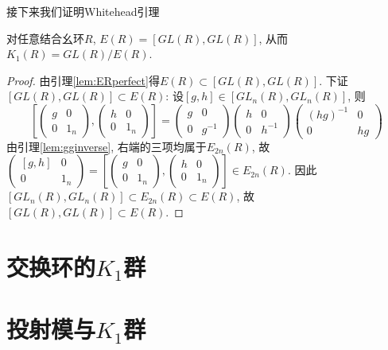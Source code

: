 接下来我们证明Whitehead引理
\begin{lemma}
	对任意结合幺环$R$, $E(R)=[GL(R),GL(R)]$, 从而$K_1(R)=GL(R)/E(R)$.
\end{lemma}
\begin{proof}
	由引理\ref{lem:ERperfect}得$E(R)\subset [GL(R),GL(R)]$. 下证$[GL(R),GL(R)]\subset E(R)$:
	设$[g,h]\in [GL_n(R),GL_n(R)]$, 则
	\[\left[\begin{pmatrix}
	g & 0\\ 0 & 1_n
\end{pmatrix},\begin{pmatrix}
	h & 0\\ 0 & 1_n
\end{pmatrix}\right]=\begin{pmatrix}
	g & 0\\ 0 & g^{-1}
\end{pmatrix}\begin{pmatrix}
	h & 0\\ 0 & h^{-1}
\end{pmatrix}\begin{pmatrix}
	(hg)^{-1} & 0\\ 0 & hg
\end{pmatrix}\]
由引理\ref{lem:gginverse}, 右端的三项均属于$E_{2n}(R)$, 故$\begin{pmatrix}
	[g,h] & 0\\ 0 & 1_n
\end{pmatrix}=\left[\begin{pmatrix}
	g & 0\\ 0 & 1_n
\end{pmatrix},\begin{pmatrix}
	h & 0\\ 0 & 1_n
\end{pmatrix}\right]\in E_{2n}(R)$. 因此$[GL_n(R),GL_n(R)]\subset E_{2n}(R)\subset E(R)$, 故$[GL(R),GL(R)]\subset E(R)$.
\end{proof}








\section{交换环的$K_1$群}


\section{投射模与$K_1$群}


















